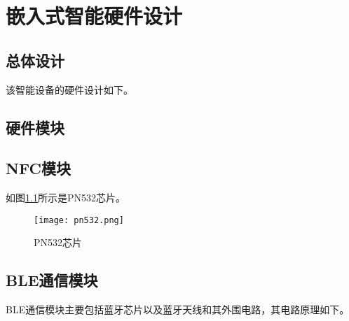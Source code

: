 \chapter{嵌入式智能硬件设计}
\section{总体设计}
该智能设备的硬件设计如下。


\section{硬件模块}

\section{NFC模块}
如图\ref{pn532}所示是PN532芯片。

\begin{figure}[!h]
 \centering
 \texttt{[image: pn532.png]}
 \caption{PN532芯片}
 \label{pn532}
\end{figure}




\section{BLE通信模块}

BLE通信模块主要包括蓝牙芯片以及蓝牙天线和其外围电路，其电路原理如下。